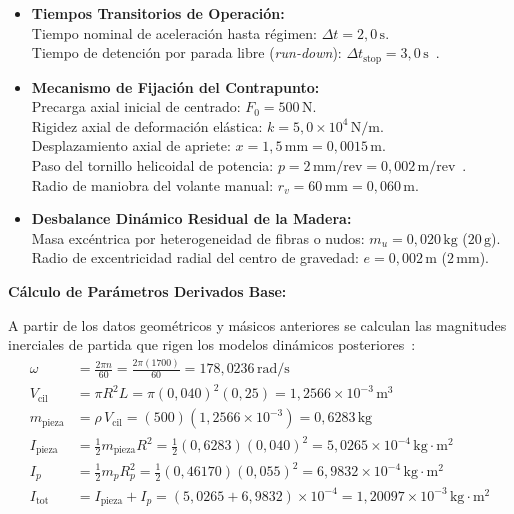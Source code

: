 \documentclass[12pt,a4paper]{article}
\begin{document}
\begin{itemize}[leftmargin=20pt, itemsep=8pt, parsep=3pt, topsep=6pt]
    \item \textbf{Tiempos Transitorios de Operación:}\\
    Tiempo nominal de aceleración hasta régimen: $\Delta t = 2{,}0\,\text{s}$.\\
    Tiempo de detención por parada libre (\textit{run-down}): $\Delta t_{\text{stop}} = 3{,}0\,\text{s}$~\cite{urinov2024}.

    \item \textbf{Mecanismo de Fijación del Contrapunto:}\\
    Precarga axial inicial de centrado: $F_0 = 500\,\text{N}$.\\
    Rigidez axial de deformación elástica: $k = 5{,}0\times 10^4\,\text{N/m}$.\\
    Desplazamiento axial de apriete: $x = 1{,}5\,\text{mm} = 0{,}0015\,\text{m}$.\\
    Paso del tornillo helicoidal de potencia: $p = 2\,\text{mm/rev} = 0{,}002\,\text{m/rev}$~\cite{norton2013}.\\
    Radio de maniobra del volante manual: $r_v = 60\,\text{mm} = 0{,}060\,\text{m}$.

    \item \textbf{Desbalance Dinámico Residual de la Madera:}\\
    Masa excéntrica por heterogeneidad de fibras o nudos: $m_u = 0{,}020\,\text{kg}$ ($20\,\text{g}$).\\
    Radio de excentricidad radial del centro de gravedad: $e = 0{,}002\,\text{m}$ ($2\,\text{mm}$).
\end{itemize}

\vspace{10pt}
\noindent\textbf{Cálculo de Parámetros Derivados Base:}

\vspace{4pt}
A partir de los datos geométricos y másicos anteriores se calculan las magnitudes inerciales de partida que rigen los modelos dinámicos posteriores~\cite{guia_dinamica, hibbeler2016}:
\begin{align}
    \omega &= \frac{2\pi n}{60} = \frac{2\pi (1700)}{60} = 178{,}0236\,\text{rad/s} \\[8pt]
    V_{\text{cil}} &= \pi R^2 L = \pi (0{,}040)^2 (0{,}25) = 1{,}2566 \times 10^{-3}\,\text{m}^3 \\[8pt]
    m_{\text{pieza}} &= \rho \, V_{\text{cil}} = (500)(1{,}2566 \times 10^{-3}) = 0{,}6283\,\text{kg} \\[8pt]
    I_{\text{pieza}} &= \frac{1}{2} m_{\text{pieza}} R^2 = \frac{1}{2}(0{,}6283)(0{,}040)^2 = 5{,}0265 \times 10^{-4}\,\text{kg}\cdot\text{m}^2 \\[8pt]
    I_p &= \frac{1}{2} m_p R_p^2 = \frac{1}{2}(0{,}46170)(0{,}055)^2 = 6{,}9832 \times 10^{-4}\,\text{kg}\cdot\text{m}^2 \\[8pt]
    I_{\text{tot}} &= I_{\text{pieza}} + I_p = (5{,}0265 + 6{,}9832)\times 10^{-4} = 1{,}20097 \times 10^{-3}\,\text{kg}\cdot\text{m}^2
\end{align}
\end{document}
